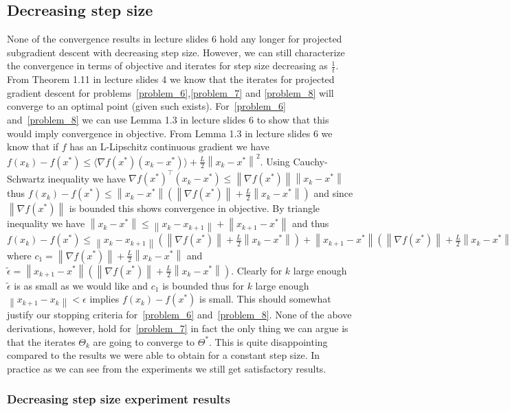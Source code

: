 \documentclass{article}
\newcommand{\0}{\mathrm{0}}
\newcommand{\1}{\mathrm{1}}
\newcommand{\norm}[1]{\left\| #1 \right\|}
\newcommand{\red}[1]{{\color{red}{#1}}}
\begin{document}
\subsection{Decreasing step size}
None of the convergence results in lecture slides 6 hold any longer for projected subgradient descent with decreasing step size. However, we can still characterize the convergence in terms of objective and iterates for step size decreasing as $\frac{1}{t}$. From Theorem 1.11 in lecture slides 4 we know that the iterates for projected gradient descent for problems~\ref{problem_6},\ref{problem_7} and \ref{problem_8} will converge to an optimal point (given such exists). For~\ref{problem_6} and~\ref{problem_8} we can use Lemma 1.3 in lecture slides 6 to show that this would imply convergence in objective. From Lemma 1.3 in lecture slides 6 we know that if $f$ has an L-Lipschitz continuous gradient we have $f(x_k) - f(x^*) \leq \langle\nabla f(x^*)(x_k-x^*)\rangle + \frac{L}{2}\norm{x_k-x^*}^2$. Using Cauchy-Schwartz inequality we have $\nabla f(x^*)^\top (x_k-x^*) \leq \norm{\nabla f(x^*)}\norm{x_k-x^*}$ thus $f(x_k) - f(x^*) \leq \norm{x_k-x^*}\left(\norm{\nabla f(x^*)} + \frac{L}{2}\norm{x_k-x^*}\right)$ and since $\norm{\nabla f(x^*)}$ is bounded this shows convergence in objective. By triangle inequality we have $\norm{x_k-x^*} \leq \norm{x_k-x_{k+1}} + \norm{x_{k+1} - x^*}$ and thus $f(x_k) - f(x^*) \leq \norm{x_k-x_{k+1}}(\norm{\nabla f(x^*)} + \frac{L}{2}\norm{x_k-x^*}) + \norm{x_{k+1}-x^*}\left(\norm{\nabla f(x^*)} + \frac{L}{2}\norm{x_k-x^*}\right) \leq \norm{x_k-x_{k+1}}c_1 + \tilde{\epsilon}$ where $c_1 = \norm{\nabla f(x^*)}  + \frac{L}{2}\norm{x_k-x^*}$ and $\tilde{\epsilon} = \norm{x_{k+1}-x^*}\left(\norm{\nabla f(x^*)} + \frac{L}{2}\norm{x_k-x^*}\right)$. Clearly for $k$ large enough $\tilde{\epsilon}$ is as small as we would like and $c_1$ is bounded thus for $k$ large enough $\norm{x_{k+1} - x_k} < \epsilon$ implies $f(x_k) - f(x^*)$ is small. This should somewhat justify our stopping criteria for~\ref{problem_6} and~\ref{problem_8}. None of the above derivations, however, hold for~\ref{problem_7} in fact the only thing we can argue is that the iterates $\Theta_k$ are going to converge to $\Theta^*$. This is quite disappointing compared to the results we were able to obtain for a constant step size. In practice as we can see from the experiments we still get satisfactory results.
\red{TODO:Include experiments and comment in same way as in previous section}

\subsubsection{Decreasing step size experiment results}
\end{document}
